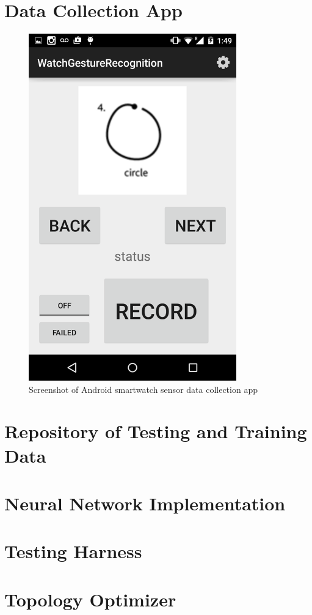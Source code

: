 \documentclass{report}
\begin{document}
\section{Data Collection App}

\begin{figure}[ht!]
  \centering
  \includegraphics[width=90mm]{app}
  \caption{Screenshot of Android smartwatch sensor data collection app}
\end{figure}

\section{Repository of Testing and Training Data}

\section{Neural Network Implementation}

\section{Testing Harness}

\section{Topology Optimizer}
\end{document}
